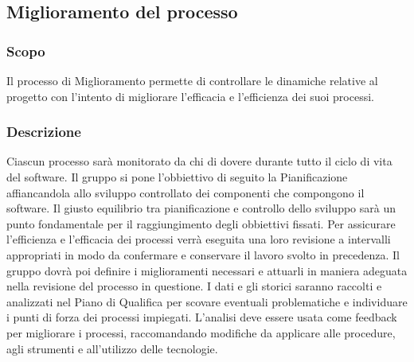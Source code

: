\subsection{Miglioramento del processo} \label{_miglioramentoDelProcesso}
\subsubsection{Scopo}
Il processo di Miglioramento permette di controllare le dinamiche relative al progetto con l'intento di migliorare l'efficacia e l'efficienza dei suoi processi.
\subsubsection{Descrizione}
Ciascun processo sarà monitorato da chi di dovere durante tutto il ciclo di vita del software. Il gruppo si pone l'obbiettivo di seguito la Pianificazione affiancandola allo sviluppo controllato dei componenti che compongono il software. Il giusto equilibrio tra pianificazione e controllo dello sviluppo sarà un punto fondamentale per il raggiungimento degli obbiettivi fissati. Per assicurare l'efficienza e l'efficacia dei processi verrà eseguita una loro revisione a intervalli appropriati in modo da confermare e conservare il lavoro svolto in precedenza. Il gruppo dovrà poi definire i miglioramenti necessari e attuarli in maniera adeguata nella revisione del processo in questione. I dati e gli storici saranno raccolti e analizzati nel Piano di Qualifica per scovare eventuali problematiche e individuare i punti di forza dei processi impiegati. L'analisi deve essere usata come feedback per migliorare i processi, raccomandando modifiche da applicare alle procedure, agli strumenti e all'utilizzo delle tecnologie.
